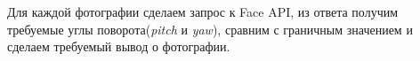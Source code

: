 \solutionSection

Для каждой фотографии сделаем запрос к Face API, из ответа получим требуемые углы поворота(\textit{pitch} и \textit{yaw}), сравним с граничным значением и сделаем требуемый вывод о фотографии.

\codeExample

